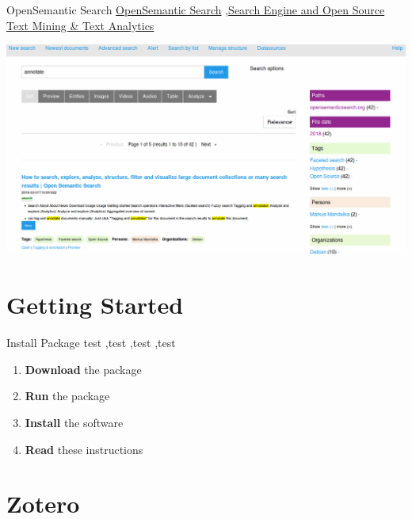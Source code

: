 \documentclass[10pt,a4paper]{article}
\begin{document}
\begin{textbox}{OpenSemantic Search}
 \href{https://www.opensemanticsearch.org}{OpenSemantic Search} \sep \href{https://www.opensemanticsearch.org}{Search Engine and Open Source Text Mining & Text Analytics}

\includegraphics[width=\textwidth]{search.png}

\end{textbox}



\section{Getting Started}



\begin{textbox}{Install Package}
test  \sep test \sep test \sep test

\bigskip

\begin{enumerate}
\item \textbf{Download} the package
\item \textbf{Run} the package
\item \textbf{Install} the software
\item \textbf{Read} these instructions
\end{enumerate}

\end{textbox}



\section{Zotero}
\end{document}
